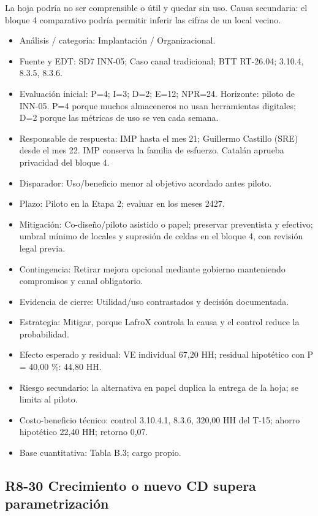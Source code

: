 La hoja podría no ser comprensible o útil y quedar sin uso. Causa secundaria: el bloque 4 comparativo podría permitir inferir las cifras de un local vecino.

\begin{itemize}[leftmargin=*,itemsep=3pt]
\item Análisis / categoría: Implantación / Organizacional.
\item Fuente y EDT: SD7 INN-05; Caso canal tradicional; BTT RT-26.04; 3.10.4, 8.3.5, 8.3.6.
\item Evaluación inicial: P=4; I=3; D=2; E=12; NPR=24. Horizonte: piloto de INN-05. P=4 porque muchos almaceneros no usan herramientas digitales; D=2 porque las métricas de uso se ven cada semana.
\item Responsable de respuesta: IMP hasta el mes 21; Guillermo Castillo (SRE) desde el mes 22. IMP conserva la familia de esfuerzo. Catalán aprueba privacidad del bloque 4.
\item Disparador: Uso/beneficio menor al objetivo acordado antes piloto.
\item Plazo: Piloto en la Etapa 2; evaluar en los meses 24\textendash{}27.
\item Mitigación: Co-diseño/piloto asistido o papel; preservar preventista y efectivo; umbral mínimo de locales y supresión de celdas en el bloque 4, con revisión legal previa.
\item Contingencia: Retirar mejora opcional mediante gobierno manteniendo compromisos y canal obligatorio.
\item Evidencia de cierre: Utilidad/uso contrastados y decisión documentada.
\item Estrategia: Mitigar, porque LafroX controla la causa y el control reduce la probabilidad.
\item Efecto esperado y residual: VE individual 67,20 HH; residual hipotético con P = 40,00 \%: 44,80 HH.
\item Riesgo secundario: la alternativa en papel duplica la entrega de la hoja; se limita al piloto.
\item Costo-beneficio técnico: control 3.10.4.1, 8.3.6, 320,00 HH del T-15; ahorro hipotético 22,40 HH; retorno 0,07.
\item Base cuantitativa: Tabla B.3; cargo propio.
\end{itemize}

\subsection*{R8-30 \textemdash{} Crecimiento o nuevo CD supera parametrización}

